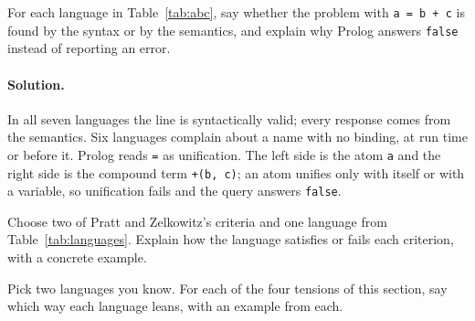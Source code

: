 \begin{exercise}
For each language in Table~\ref{tab:abc}, say whether the problem with
\texttt{a = b + c} is found by the syntax or by the semantics, and explain why
Prolog answers \texttt{false} instead of reporting an error.
\end{exercise}

\paragraph{Solution.} In all seven languages the line is syntactically valid;
every response comes from the semantics. Six languages complain about a name
with no binding, at run time or before it. Prolog reads \texttt{=} as
unification. The left side is the atom \texttt{a} and the right side is the
compound term \texttt{+(b, c)}; an atom unifies only with itself or with a
variable, so unification fails and the query answers \texttt{false}.

\begin{exercise}
Choose two of Pratt and Zelkowitz's criteria and one language from
Table~\ref{tab:languages}. Explain how the language satisfies or fails each
criterion, with a concrete example.
\end{exercise}

\begin{exercise}
Pick two languages you know. For each of the four tensions of this section,
say which way each language leans, with an example from each.
\end{exercise}

